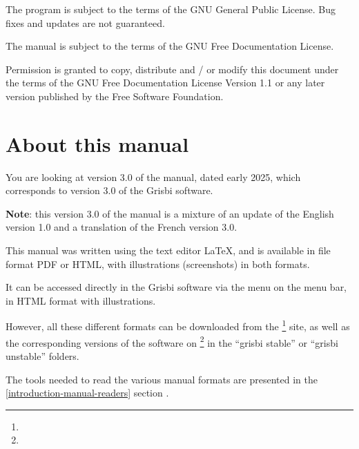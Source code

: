 The program is subject to the terms of the \gls{GNU General Public License}.  Bug fixes and updates are not guaranteed.

The manual is subject to the terms of the \gls{GNU Free Documentation License}.

Permission is granted to copy, distribute and / or modify this document under the terms of the GNU Free Documentation License Version 1.1 or any later version published by the Free Software Foundation.

\section{About this manual \label{introduction-manual}}

You are looking at version \actuality{}3.0 of the manual, dated \actuality{} early 2025, which corresponds to version 3.0 of the Grisbi software.


\textbf{Note}: this version 3.0 of the manual is a mixture of an update of the English version 1.0 and a translation of the French version 3.0.


This manual was written using the \gls{text editor} \gls{LaTeX}, and is available in \gls{file format} \gls{PDF} or \gls{HTML}, with illustrations (screenshots) in both formats.


It can be accessed directly in the Grisbi software via the  menu on the menu bar, in \gls{HTML} format with illustrations.


However, all these different formats can be downloaded from the \footnote{\urlSourceForgeDocumentation{}} site, as well as the corresponding versions of the software on \footnote{\urlSourceForge{}} in the ``\textsf{grisbi stable}'' or ``\textsf{grisbi unstable}'' folders.


The tools needed to read the various manual formats are presented in the  \vref{introduction-manual-readers} section .


